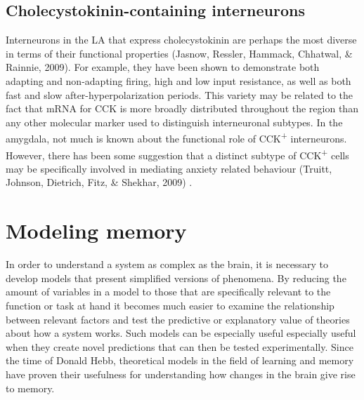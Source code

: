 \documentclass[12pt,a4paper,]{report}
\begin{document}
\subsection{Cholecystokinin-containing
interneurons}\label{cholecystokinin-containing-interneurons}

Interneurons in the LA that express cholecystokinin are perhaps the most
diverse in terms of their functional properties (Jasnow, Ressler,
Hammack, Chhatwal, \& Rainnie, 2009). For example, they have been shown
to demonstrate both adapting and non-adapting firing, high and low input
resistance, as well as both fast and slow after-hyperpolarization
periods. This variety may be related to the fact that mRNA for CCK is
more broadly distributed throughout the region than any other molecular
marker used to distinguish interneuronal subtypes. In the amygdala, not
much is known about the functional role of CCK\textsuperscript{+}
interneurons. However, there has been some suggestion that a distinct
subtype of CCK\textsuperscript{+} cells may be specifically involved in
mediating anxiety related behaviour (Truitt, Johnson, Dietrich, Fitz, \&
Shekhar, 2009) .

\section{Modeling memory}\label{modeling-memory}

In order to understand a system as complex as the brain, it is necessary
to develop models that present simplified versions of phenomena. By
reducing the amount of variables in a model to those that are
specifically relevant to the function or task at hand it becomes much
easier to examine the relationship between relevant factors and test the
predictive or explanatory value of theories about how a system works.
Such models can be especially useful especially useful when they create
novel predictions that can then be tested experimentally. Since the time
of Donald Hebb, theoretical models in the field of learning and memory
have proven their usefulness for understanding how changes in the brain
give rise to memory.
\end{document}
